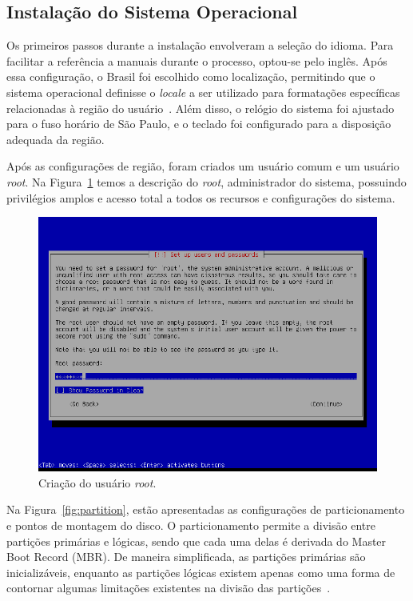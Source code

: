 \documentclass[
	12pt,				%
	oneside,   	        %
	a4paper,			%
	english,			%
	french,				%
	spanish,			%
	brazil,				%
	]{pacotes/abntex2}
\begin{document}
\subsection{Instalação do Sistema Operacional}
\label{subsec:instalacao}

Os primeiros passos durante a instalação envolveram a seleção do idioma. Para facilitar a referência a manuais durante o processo, optou-se pelo inglês. Após essa configuração, o Brasil foi escolhido como localização, permitindo que o sistema operacional definisse o \textit{locale} a ser utilizado para formatações específicas relacionadas à região do usuário~\cite{kerris2010}. Além disso, o relógio do sistema foi ajustado para o fuso horário de São Paulo, e o teclado foi configurado para a disposição adequada da região.

Após as configurações de região, foram criados um usuário comum e um usuário \textit{root}. Na Figura~\ref{fig:root} temos a descrição do \textit{root}, administrador do sistema, possuindo privilégios amplos e acesso total a todos os recursos e configurações do sistema.

\begin{figure}[H]
  \centering
  \includegraphics[scale=0.7]{figuras/root.png}
  \caption{Criação do usuário \textit{root}.}
  \label{fig:root}
\end{figure}

Na Figura~\ref{fig:partition}, estão apresentadas as configurações de particionamento e pontos de montagem do disco. O particionamento permite a divisão entre partições primárias e lógicas, sendo que cada uma delas é derivada do Master Boot Record (MBR). De maneira simplificada, as partições primárias são inicializáveis, enquanto as partições lógicas existem apenas como uma forma de contornar algumas limitações existentes na divisão das partições~\cite{negus2012}.
\end{document}
